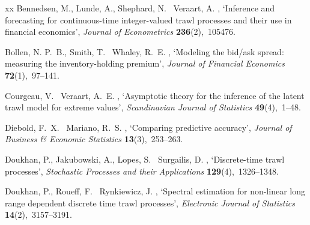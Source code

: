 \documentclass{article}
\theoremstyle{plain}
\theoremstyle{definition}
\theoremstyle{remark}
\begin{document}
\begin{thebibliography}{xx}
Bennedsen, M., Lunde, A., Shephard, N. \harvardand\ Veraart, A.  \harvardyearright , `Inference and forecasting for continuous-time integer-valued trawl processes and their use in financial economics', {\em Journal of Econometrics} {\bf 236}(2),~105476.
\newline{}

Bollen, N. P.~B., Smith, T. \harvardand\ Whaley, R.~E.  \harvardyearright , `Modeling the bid/ask spread: measuring the inventory-holding premium', {\em Journal of Financial Economics} {\bf 72}(1),~97--141.
\newline{}

Courgeau, V. \harvardand\ Veraart, A.~E.  \harvardyearright , `Asymptotic theory for the inference of the latent trawl model for extreme values', {\em Scandinavian Journal of Statistics} {\bf 49}(4),~1--48.
\newline{}

Diebold, F.~X. \harvardand\ Mariano, R.~S.  \harvardyearright , `Comparing predictive accuracy', {\em Journal of Business \& Economic Statistics} {\bf 13}(3),~253--263.
\newline{}

Doukhan, P., Jakubowski, A., Lopes, S. \harvardand\ Surgailis, D.  \harvardyearright , `Discrete-time trawl processes', {\em Stochastic Processes and their Applications} {\bf 129}(4),~1326--1348.
\newline{}

Doukhan, P., Roueff, F. \harvardand\ Rynkiewicz, J.  \harvardyearright , `Spectral estimation for non-linear long range dependent discrete time trawl processes', {\em Electronic Journal of Statistics} {\bf 14}(2),~3157--3191.
\newline{}


\end{thebibliography}
\end{document}
